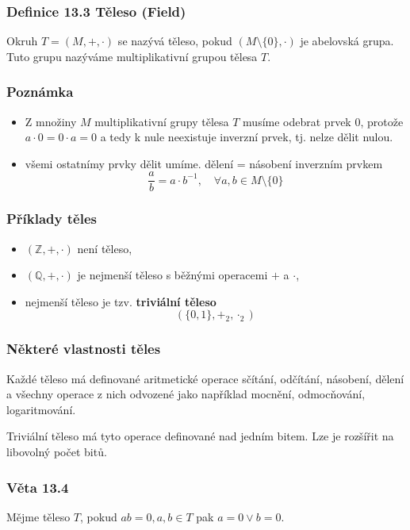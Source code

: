 \documentclass[12pt, letterpaper]{article}
\begin{document}
\subsubsection*{Definice 13.3 Těleso (Field)}
Okruh $T = (M,+,\cdot)$ se nazývá těleso, pokud $(M \setminus \{0\},\cdot)$ je abelovská grupa.
Tuto grupu nazýváme multiplikativní grupou tělesa $T$.

\subsubsection*{Poznámka}
\begin{itemize}
    \item Z množiny $M$ multiplikativní grupy tělesa $T$ musíme odebrat prvek $0$, protože
    $a \cdot 0 = 0 \cdot a = 0$ a tedy k nule neexistuje inverzní prvek, tj. nelze dělit nulou.
    \item všemi ostatnímy prvky dělit umíme.
    \subitem dělení = násobení inverzním prvkem
    \[ \frac{a}{b} = a \cdot b^{-1}, \quad \forall a,b \in M \setminus \{0\}\]
\end{itemize}

\subsubsection*{Příklady těles}
\begin{itemize}
    \item $(\mathbb{Z},+,\cdot)$ není těleso,
    \item $(\mathbb{Q},+,\cdot)$ je nejmenší těleso s běžnými operacemi $+$ a $\cdot$,
    \item nejmenší těleso je tzv. \textbf{triviální těleso} $$(\{0,1\},+_2,\cdot_2)$$
\end{itemize}

\subsubsection*{Některé vlastnosti těles}
Každé těleso má definované aritmetické operace sčítání, odčítání, násobení, dělení
a všechny operace z nich odvozené jako například mocnění, odmocňování, logaritmování.

Triviální těleso má tyto operace definované nad jedním bitem. Lze je rozšířit na libovolný počet bitů.

\subsubsection*{Věta 13.4}
Mějme těleso $T$, pokud $ab = 0, a,b\in T$ pak $a = 0 \lor b = 0$.
\end{document}
